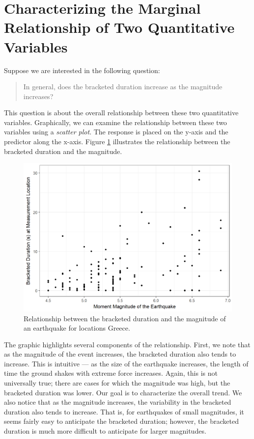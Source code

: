 \documentclass[]{book}
\theoremstyle{definition}
\theoremstyle{definition}
\theoremstyle{definition}
\theoremstyle{remark}
\begin{document}
\section{Characterizing the Marginal Relationship of Two Quantitative
Variables}\label{characterizing-the-marginal-relationship-of-two-quantitative-variables}

Suppose we are interested in the following question:

\begin{quote}
In general, does the bracketed duration increase as the magnitude
increases?
\end{quote}

This question is about the overall relationship between these two
quantitative variables. Graphically, we can examine the relationship
between these two variables using a \emph{scatter plot}. The response is
placed on the y-axis and the predictor along the x-axis. Figure
\ref{fig:regsummaries-magnitude} illustrates the relationship between
the bracketed duration and the magnitude.

\begin{figure}

{\centering \includegraphics[width=0.8\linewidth]{./Images/regsummaries-magnitude-1} 

}

\caption{Relationship between the bracketed duration and the magnitude of an earthquake for locations Greece.}\label{fig:regsummaries-magnitude}
\end{figure}

The graphic highlights several components of the relationship. First, we
note that as the magnitude of the event increases, the bracketed
duration also tends to increase. This is intuitive --- as the size of
the earthquake increases, the length of time the ground shakes with
extreme force increases. Again, this is not universally true; there are
cases for which the magnitude was high, but the bracketed duration was
lower. Our goal is to characterize the overall trend. We also notice
that as the magnitude increases, the variability in the bracketed
duration also tends to increase. That is, for earthquakes of small
magnitudes, it seems fairly easy to anticipate the bracketed duration;
however, the bracketed duration is much more difficult to anticipate for
larger magnitudes.
\end{document}
